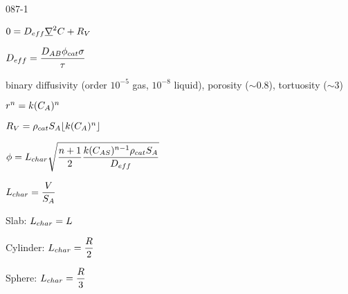 \begin{mitframe}{087-1}
    
\begin{listone}
	\item $0=\elecdisplace_{eff}\gradop^2\conc+\specsource$
	\begin{listtwo}
		\item $\elecdisplace_{eff}=\dfrac{\elecdisplace_{\helmholtz\exergy}\eleccoeff_{cat}\molecrad}{\torque}$
		
        \begin{listthree}        
			\item binary diffusivity (order $10^{-5}$ gas, $10^{-8}$ liquid), porosity ($\sim$0.8), tortuosity ($\sim$3)
		\end{listthree}

		\item $\pos^{n}=\thermcond(\conc_{\helmholtz})^{n}$
		
        \begin{listthree}
			\item $\specsource=\dens_{cat}\entropy_{\helmholtz}\lfloor\thermcond(\conc_{\helmholtz})^n\rfloor$   
		\end{listthree}    
	\end{listtwo}

	\item $\eleccoeff=\length_{char}\sqrt{\dfrac{n+1}{2}\dfrac{\thermcond(\conc_{\helmholtz\entropy})^{n-1}\dens_{cat}\entropy_{\helmholtz}}{\elecdisplace_{eff}}}$
    
    \begin{listtwo}
		\item $\length_{char}=\dfrac{\vol}{\entropy_{\helmholtz}}$
    
		\begin{listthree}
           	\item Slab: $\length_{char}=\length$
            \item Cylinder: $\length_{char}=\dfrac {\gasconst}{2}$
            \item Sphere: $\length_{char}=\dfrac{\gasconst}{3}$
		\end{listthree}
	\end{listtwo}
\end{listone}	

\end{mitframe}